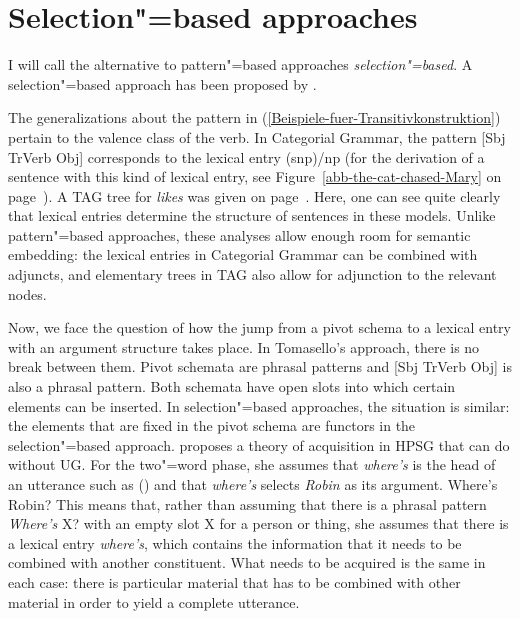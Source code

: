 \section{Selection"=based approaches}
\label{Abschnitt-Selektionsbasierter-Spracherwerb}

\addlines[2]
I will call the alternative to pattern"=based approaches \emph{selection"=based}. A selection"=based approach has
been proposed by \citet{Green-Grammar-Growth}.  

The generalizations about the pattern in (\ref{Beispiele-fuer-Transitivkonstruktion}) pertain to the valence class of the verb.
In Categorial Grammar, the pattern [Sbj TrVerb Obj] corresponds to the lexical entry (s\bs np)/np (for the derivation of a sentence
with this kind of lexical entry, see Figure~\ref{abb-the-cat-chased-Mary} on page~\pageref{abb-the-cat-chased-Mary}).
A TAG tree for \emph{likes} was given on page~\pageref{Abbildung-Max-likes-Anouk}.
Here, one can see quite clearly that lexical entries determine the structure of sentences in these models. Unlike pattern"=based approaches, these analyses allow
enough room for semantic embedding: the lexical entries in Categorial Grammar can be combined with adjuncts, and elementary trees in TAG also allow for adjunction
to the relevant nodes.

Now, we face the question of how the jump from a pivot schema to a lexical entry with an argument structure takes place. In Tomasello's approach, there is no break between them. Pivot schemata
are phrasal patterns and [Sbj TrVerb Obj] is also a phrasal pattern. Both schemata have open slots into which certain elements can be inserted.
In selection"=based approaches, the situation is similar: the elements that are fixed in the pivot schema are functors in the selection"=based approach.
\citet{Green-Grammar-Growth} proposes a theory of acquisition in HPSG that can do without UG. For the two"=word phase, she assumes that  \emph{where's} is the head
of an utterance such as () and that \emph{where's} selects \emph{Robin} as its argument.
\ea
Where's Robin?
\z
This means that, rather than assuming that there is a phrasal pattern \emph{Where's} X? with an empty slot X for a person
or thing, she assumes that there is a lexical entry \emph{where's}, which contains the information that it  needs to be combined
with another constituent. What needs to be acquired is the same in each case: there is particular material that has to be combined
with other material in order to yield a complete utterance.

